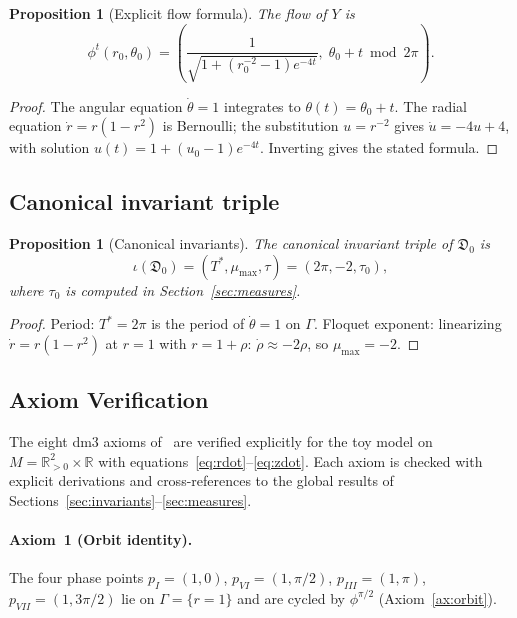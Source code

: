 \documentclass[12pt, oneside]{book}
\theoremstyle{plain}
\newtheorem{proposition}[theorem]{Proposition}
\theoremstyle{definition}
\theoremstyle{remark}
\newcommand{\dm}{\mathfrak{D}}
\newcommand{\Orb}{\Gamma}
\begin{document}
\begin{proposition}[Explicit flow formula]\label{prop:flow}
The flow of $Y$ is
\[
  \phi^t(r_0,\theta_0) =
  \left(\frac{1}{\sqrt{1+(r_0^{-2}-1)e^{-4t}}},\;
  \theta_0 + t\bmod 2\pi\right).
\]
\end{proposition}
\begin{proof}
The angular equation $\dot\theta=1$ integrates to $\theta(t)=\theta_0+t$.
The radial equation $\dot r=r(1-r^2)$ is Bernoulli; the substitution
$u=r^{-2}$ gives $\dot u=-4u+4$, with solution
$u(t)=1+(u_0-1)e^{-4t}$. Inverting gives the stated formula.
\end{proof}

\subsection{Canonical invariant triple}

\begin{proposition}[Canonical invariants]\label{prop:canonical}
The canonical invariant triple of $\dm_0$ is
\[
  \iota(\dm_0) = (T^*,\mu_{\max},\tau) = (2\pi,-2,\tau_0),
\]
where $\tau_0$ is computed in Section~\ref{sec:measures}.
\end{proposition}
\begin{proof}
Period: $T^*=2\pi$ is the period of $\dot\theta=1$ on $\Orb$.
Floquet exponent: linearizing $\dot r=r(1-r^2)$ at $r=1$ with
$r=1+\rho$: $\dot\rho\approx-2\rho$, so $\mu_{\max}=-2$.
\end{proof}

\subsection{Axiom Verification}\label{subsec:axioms}

The eight dm3 axioms of~\cite{Paper1} are verified explicitly for
the toy model on $M=\mathbb{R}^2_{>0}\times\mathbb{R}$ with
equations~\eqref{eq:rdot}--\eqref{eq:zdot}. Each axiom is checked
with explicit derivations and cross-references to the global results
of Sections~\ref{sec:invariants}--\ref{sec:measures}.

\paragraph{Axiom~1 (Orbit identity).}
The four phase points $p_I=(1,0)$, $p_{VI}=(1,\pi/2)$,
$p_{III}=(1,\pi)$, $p_{VII}=(1,3\pi/2)$ lie on $\Orb=\{r=1\}$
and are cycled by $\phi^{\pi/2}$ (Axiom~\ref{ax:orbit}).
\end{document}
